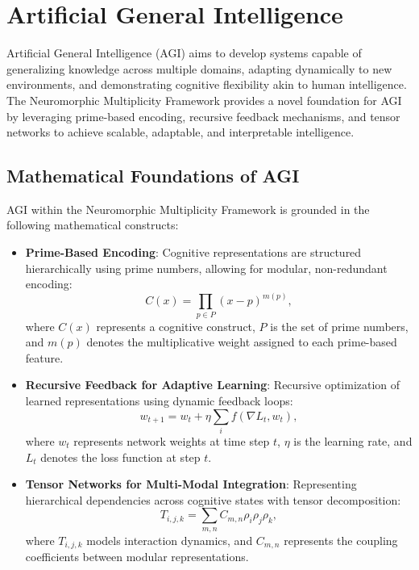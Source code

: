 \documentclass{article}
\theoremstyle{plain}
\begin{document}
\section{Artificial General Intelligence}

Artificial General Intelligence (AGI) aims to develop systems capable of generalizing knowledge across multiple domains, adapting dynamically to new environments, and demonstrating cognitive flexibility akin to human intelligence. The Neuromorphic Multiplicity Framework provides a novel foundation for AGI by leveraging prime-based encoding, recursive feedback mechanisms, and tensor networks to achieve scalable, adaptable, and interpretable intelligence.

\subsection{Mathematical Foundations of AGI}
AGI within the Neuromorphic Multiplicity Framework is grounded in the following mathematical constructs:
\begin{itemize}
    \item \textbf{Prime-Based Encoding}: Cognitive representations are structured hierarchically using prime numbers, allowing for modular, non-redundant encoding:
    \begin{equation}
        C(x) = \prod_{p \in P} (x - p)^{m(p)},
    \end{equation}
    where $C(x)$ represents a cognitive construct, $P$ is the set of prime numbers, and $m(p)$ denotes the multiplicative weight assigned to each prime-based feature.

    \item \textbf{Recursive Feedback for Adaptive Learning}: Recursive optimization of learned representations using dynamic feedback loops:
    \begin{equation}
        w_{t+1} = w_t + \eta \sum_{i} f(\nabla L_t, w_t),
    \end{equation}
    where $w_t$ represents network weights at time step $t$, $\eta$ is the learning rate, and $L_t$ denotes the loss function at step $t$.
    
    \item \textbf{Tensor Networks for Multi-Modal Integration}: Representing hierarchical dependencies across cognitive states with tensor decomposition:
    \begin{equation}
        T_{i,j,k} = \sum_{m,n} C_{m,n} \rho_i \rho_j \rho_k,
    \end{equation}
    where $T_{i,j,k}$ models interaction dynamics, and $C_{m,n}$ represents the coupling coefficients between modular representations.
\end{itemize}
\end{document}
